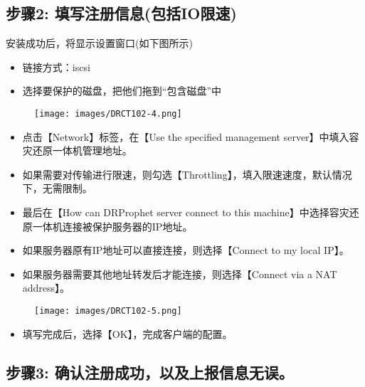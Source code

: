 \subsection{步骤2: 填写注册信息(包括IO限速)}
\label{步骤2:填写注册信息包括io限速}

安装成功后，将显示设置窗口(如下图所示)

\begin{itemize}
\item 链接方式：iscsi

\item 选择要保护的磁盘，把他们拖到``包含磁盘''中

\end{itemize}

\begin{figure}[htbp]
\centering
\texttt{[image: images/DRCT102-4.png]}
\end{figure}

\begin{itemize}
\item 点击【Network】标签，在【Use the specified management server】中填入容灾还原一体机管理地址。

\item 如果需要对传输进行限速，则勾选【Throttling】，填入限速速度，默认情况下，无需限制。

\item 最后在【How can DRProphet server connect to this machine】中选择容灾还原一体机连接被保护服务器的IP地址。

\item 如果服务器原有IP地址可以直接连接，则选择【Connect to my local IP】。

\item 如果服务器需要其他地址转发后才能连接，则选择【Connect via a NAT address】。

\end{itemize}

\begin{figure}[htbp]
\centering
\texttt{[image: images/DRCT102-5.png]}
\end{figure}

\begin{itemize}
\item 填写完成后，选择【OK】，完成客户端的配置。

\end{itemize}

\subsection{步骤3: 确认注册成功，以及上报信息无误。}
\label{步骤3:确认注册成功，以及上报信息无误。}

